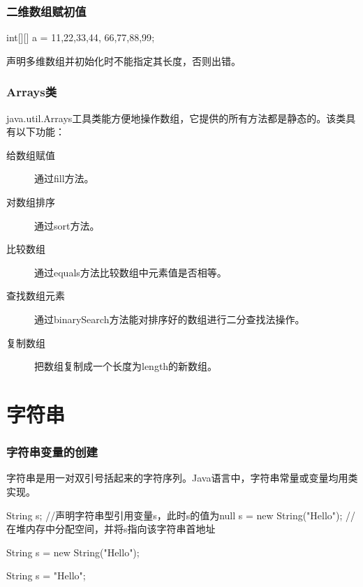 \begin{frame}[fragile]
  \frametitle{二维数组赋初值}

  \begin{javaCode}
    int[][] a = {{11,22,33,44}, {66,77,88,99}};    
  \end{javaCode}


  声明多维数组并初始化时不能指定其长度，否则出错。


\end{frame}

\begin{frame}[fragile]
  \frametitle{Arrays类}

  java.util.Arrays工具类能方便地操作数组，它提供的所有方法都是静态的。该类具有以下功能：

  \begin{description}
  \item[给数组赋值] 通过fill方法。
  \item[对数组排序] 通过sort方法。
  \item[比较数组] 通过equals方法比较数组中元素值是否相等。
  \item[查找数组元素] 通过binarySearch方法能对排序好的数组进行二分查找法操作。
  \item[复制数组] 把数组复制成一个长度为length的新数组。
  \end{description}

\end{frame}

\section{字符串}

\begin{frame}[fragile]
  \frametitle{字符串变量的创建}

  字符串是用一对双引号括起来的字符序列。Java语言中，字符串常量或变量均用类实现。


  \begin{javaCode}
    String s;                  //声明字符串型引用变量s，此时s的值为null
    s = new String("Hello");   //在堆内存中分配空间，并将s指向该字符串首地址 
  \end{javaCode}

  \begin{javaCode}
    String s = new String("Hello");
  \end{javaCode}

  \begin{javaCode}
    String s = "Hello";
  \end{javaCode}

\end{frame}

